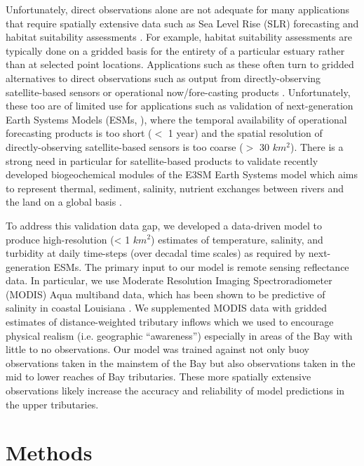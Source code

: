 \documentclass{article}
\begin{document}
Unfortunately, direct observations alone are not adequate for many applications that require spatially extensive data such as Sea Level Rise (SLR) forecasting and habitat suitability assessments \cite{hoodChesapeakeBayProgram2021}. For example, habitat suitability assessments are typically done on a gridded basis for the entirety of a particular estuary rather than at selected point locations. Applications such as these often turn to gridded alternatives to direct observations such as output from directly-observing satellite-based sensors \cite{foreCombinedActivePassive2016} or operational now/fore-casting products \cite{lanerolle2011second}. Unfortunately, these too are of limited use for applications such as validation of next-generation Earth Systems Models (ESMs, \cite{golazDOEE3SMModel2022, xuDevelopmentLandRiver2022a}), where the temporal availability of operational forecasting products is too short ($<$ 1 year) and the spatial resolution of directly-observing satellite-based sensors is too coarse ($>$ 30 $km^2$). There is a strong need in particular for satellite-based products to validate recently developed biogeochemical modules of the E3SM Earth Systems model which aims to represent thermal, sediment, salinity, nutrient exchanges between rivers and the land on a global basis \cite{xuDevelopmentLandRiver2022a}.

To address this validation data gap, we developed a data-driven model to produce high-resolution (< 1 $km^2$) estimates of temperature, salinity, and turbidity at daily time-steps (over decadal time scales) as required by next-generation ESMs. The primary input to our model is remote sensing reflectance data. In particular, we use Moderate Resolution Imaging Spectroradiometer (MODIS) Aqua multiband data, which has been shown to be predictive of salinity in coastal Louisiana \cite{vogelAssessingSatelliteSea2016, wangDevelopmentMODISData2018}. We supplemented MODIS data with gridded estimates of distance-weighted tributary inflows which we used to encourage physical realism (i.e. geographic “awareness”) especially in areas of the Bay with little to no observations. Our model was trained against not only buoy observations taken in the mainstem of the Bay but also observations taken in the mid to lower reaches of Bay tributaries. These more spatially extensive observations likely increase the accuracy and reliability of model predictions in the upper tributaries.


\section{Methods}
\end{document}
